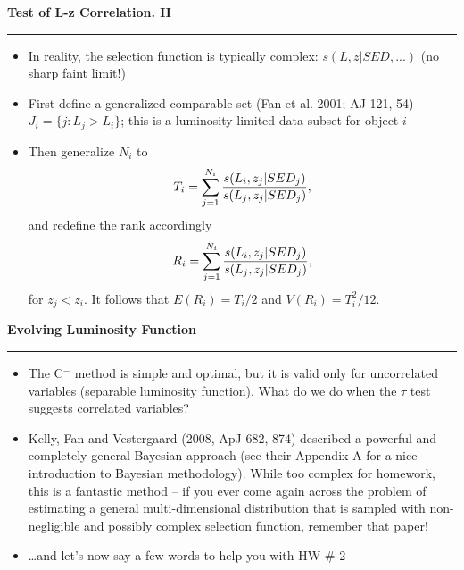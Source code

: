 \documentclass[letterpaper,landscape]{slides}
\begin{document}
\begin{slide}
\begin{center}
\bfseries
{\large {\color{red} Test of L-z Correlation. II}}
\end{center}
\vskip 0.2in
\hrule

\begin{itemize}
\item In reality, the selection function is typically complex:
      $s(L,z|SED, ...)$ (no sharp faint limit!)
\item First define a generalized comparable set (Fan et al. 2001;
      AJ 121, 54)
      $J_i = \{ j:L_j > L_i\}$; this is a luminosity limited data 
      subset for object $i$
\item Then generalize $N_i$ to
\begin{equation}
        T_i = \sum_{j=1}^{N_i} {s(L_i, z_j|SED_j) \over s(L_j, z_j|SED_j)},
\end{equation}
and redefine the rank accordingly
\begin{equation}
        R_i = \sum_{j=1}^{N_i} {s(L_i, z_j|SED_j) \over s(L_j, z_j|SED_j)},
\end{equation}
for $z_j < z_i$. It follows that $E(R_i) = T_i/2$ and $V(R_i) = T_i^2/12$. 

\end{itemize}

\vfill
\end{slide}
 



\begin{slide}
\begin{center}
\bfseries
{\large {\color{red} Evolving Luminosity Function}}
\end{center}
\vskip 0.2in
\hrule

\begin{itemize}
\item The C$^-$ method is simple and optimal, but it is valid only 
      for uncorrelated variables (separable luminosity function). 
      What do we do when the $\tau$ test suggests correlated 
      variables? 
\item  Kelly, Fan and Vestergaard (2008, ApJ 682, 874)
      described a powerful and completely general Bayesian approach
      (see their Appendix A for a nice introduction to Bayesian methodology). 
      While too complex for homework, this is a fantastic method -- if you ever
      come again across the problem of estimating a general multi-dimensional
      distribution that is sampled with non-negligible and possibly 
      complex selection function, remember that paper!

\item \dots and let's now say a few words to help you with HW \# 2
\end{itemize}

\vfill
\end{slide}
 
\end{document}

